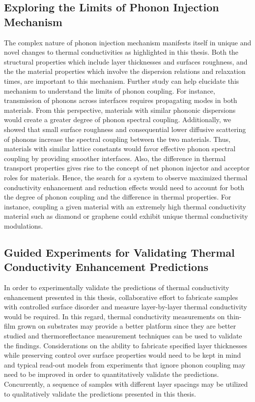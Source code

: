 \subsection{Exploring the Limits of Phonon Injection Mechanism}
The complex nature of phonon injection mechanism manifests itself in unique and novel changes to thermal conductivities as highlighted in this thesis. Both the structural properties which include layer thicknesses and surfaces roughness, and the the material properties which involve the dispersion relations and relaxation times, are important to this mechanism.  Further study can help elucidate this mechanism to understand the limits of phonon coupling. For instance, transmission of phonons across interfaces requires propagating modes in both materials. From this perspective, materials with similar phononic dispersions would create a greater degree of phonon spectral coupling. Additionally, we showed that small surface roughness and consequential lower diffusive scattering of phonons increase the spectral coupling between the two materials. Thus, materials with similar lattice constants would favor effective phonon spectral coupling by providing smoother interfaces. Also, the difference in thermal transport properties gives rise to the concept of net phonon injector and acceptor roles for materials. Hence, the search for a system to observe maximized thermal conductivity enhancement and reduction effects would need to account for both the degree of phonon coupling and the difference in thermal properties. For instance, coupling a given material with an extremely high thermal conductivity material such as diamond or graphene could exhibit unique thermal conductivity modulations.  

\subsection{Guided Experiments for Validating Thermal Conductivity Enhancement Predictions}
In order to experimentally validate the predictions of thermal conductivity enhancement presented in this thesis, collaborative effort to fabricate samples with controlled surface disorder and measure layer-by-layer thermal conductivity would be required. In this regard, thermal conductivity measurements on thin-film grown on substrates may provide a better platform since they are better studied and thermoreflectance measurement techniques can be used to validate the findings. Considerations on the ability to fabricate specified layer thicknesses while preserving control over surface properties would need to be kept in mind and typical read-out models from experiments that ignore phonon coupling may need to be improved in order to quantitatively validate the predictions. Concurrently, a sequence of samples with different layer spacings may be utilized to qualitatively validate the predictions presented in this thesis.

